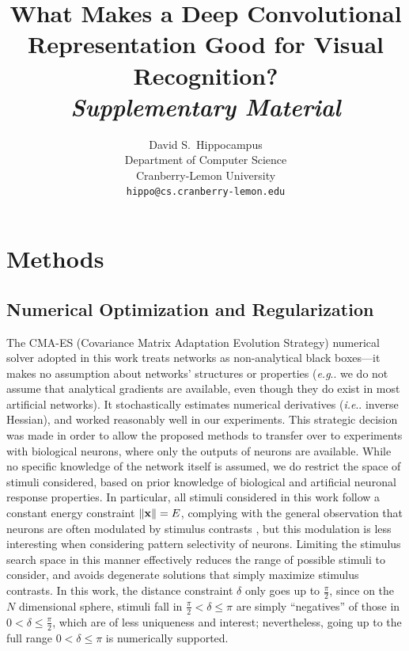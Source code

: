 \documentclass{article} %
\title{What Makes a Deep Convolutional Representation Good for Visual Recognition?\\\emph{Supplementary Material}}
\author{
David S.~Hippocampus\\
Department of Computer Science\\
Cranberry-Lemon University\\
\texttt{hippo@cs.cranberry-lemon.edu} \\
}
\makeatletter
\DeclareRobustCommand\onedot{\futurelet\@let@token\@onedot}
\def\@onedot{\ifx\@let@token.\else.\null\fi\xspace}
\def\eg{\emph{e.g}\onedot} \def\Eg{\emph{E.g}\onedot}
\def\ie{\emph{i.e}\onedot} \def\Ie{\emph{I.e}\onedot}
\makeatother
\begin{document}
\maketitle
\vspace{-2.0ex}

\tableofcontents
\clearpage

\section{Methods}

\subsection{Numerical Optimization and Regularization}

The CMA-ES (Covariance Matrix Adaptation Evolution Strategy) numerical solver \cite{hansen2001completely} adopted in this work treats networks as non-analytical black boxes---it makes no assumption about networks' structures or properties (\eg we do not assume that analytical gradients are available, even though they do exist in most artificial networks). 
It stochastically estimates numerical derivatives (\ie inverse Hessian), and worked reasonably well in our experiments.
This strategic decision {was} made in order to allow the proposed methods to transfer over to experiments with biological neurons, where only the outputs of neurons are available. While no specific knowledge of the network itself is assumed, we do restrict the space of stimuli considered, based on prior knowledge of biological and artificial neuronal response properties. In particular, all stimuli considered in this work follow a constant energy constraint $\left\| \bf{x} \right\| = E$, complying with the general observation that neurons are often modulated by stimulus contrasts \cite{albrecht1982striate, cheng1994comparison}, but this modulation is less interesting when considering pattern selectivity of neurons. Limiting the stimulus search space in this manner effectively reduces the range of possible stimuli to consider, and avoids degenerate solutions that simply maximize stimulus contrasts.
In this work, the distance constraint $\delta$ only goes up to $\frac{\pi}{2}$, since on the $N$ dimensional sphere, stimuli fall in $\frac{\pi}{2} < \delta \le \pi$ are simply ``negatives'' of those in $0 < \delta \le \frac{\pi}{2}$, which are of less uniqueness and interest; nevertheless, going up to the full range $0 < \delta \le \pi$ is numerically supported.
\end{document}
